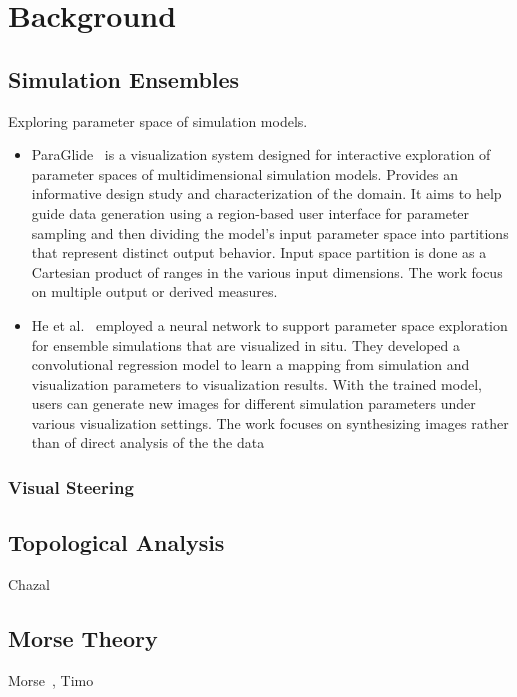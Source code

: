 \section{Background}
\label{sec:bg}

\subsection{Simulation Ensembles}
Exploring parameter space of simulation models.
\begin{itemize}
    \item ParaGlide~\cite{Bergner13} is a visualization system designed for interactive exploration of parameter spaces of multidimensional simulation models. Provides an informative design study and characterization of the domain. It aims to help guide data generation using a region-based user interface for parameter sampling and then dividing the model's input parameter space into partitions that represent distinct output behavior. Input space partition is done as a Cartesian product of ranges in the various input dimensions. The work focus on multiple output or derived measures.
    
    \item He et al.~\cite{He2020} employed a neural network to support parameter space exploration for ensemble simulations that are visualized in situ. They developed a convolutional regression model to learn a mapping from simulation and visualization parameters to visualization results. With the trained model, users can generate new images for different simulation parameters under various visualization settings. The work focuses on synthesizing images rather than of direct analysis of the the data
\end{itemize}

\subsubsection{Visual Steering}
\cite{Matkovic14, Splechtna15, Matkovic18}

\subsection{Topological Analysis}
Chazal~\cite{Chazal11}

\subsection{Morse Theory}
\label{sec:morse}
Morse~\cite{morse63}, Timo~\cite{Timo04}

